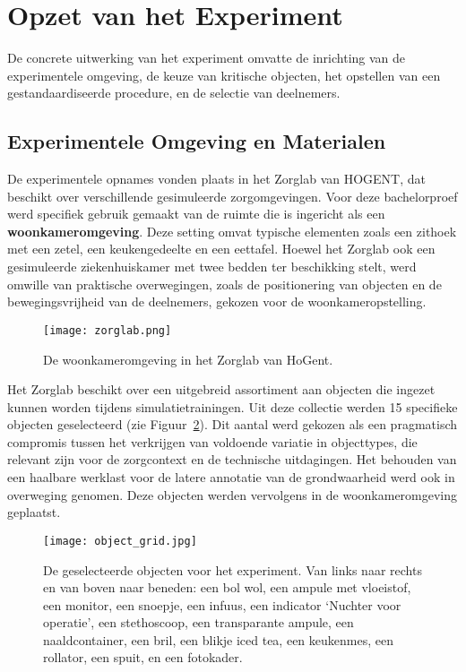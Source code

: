 \section{Opzet van het Experiment}

De concrete uitwerking van het experiment omvatte de inrichting van de experimentele omgeving, de keuze van kritische objecten, het opstellen van een gestandaardiseerde procedure, en de selectie van deelnemers.

\subsection{Experimentele Omgeving en Materialen}

De experimentele opnames vonden plaats in het Zorglab van HOGENT, dat beschikt over verschillende gesimuleerde zorgomgevingen. 
Voor deze bachelorproef werd specifiek gebruik gemaakt van de ruimte die is ingericht als een \textbf{woonkameromgeving}. 
Deze setting omvat typische elementen zoals een zithoek met een zetel, een keukengedeelte en een eettafel. 
Hoewel het Zorglab ook een gesimuleerde ziekenhuiskamer met twee bedden ter beschikking stelt, werd omwille van praktische overwegingen, 
zoals de positionering van objecten en de bewegingsvrijheid van de deelnemers, gekozen voor de woonkameropstelling.

\begin{figure}[H]
  \centering
  \texttt{[image: zorglab.png]}
  \caption[
De woonkameromgeving in het Zorglab van HoGent.
  ]{\label{fig:zorglab} De woonkameromgeving in het Zorglab van HoGent.}
\end{figure}

Het Zorglab beschikt over een uitgebreid assortiment aan objecten die ingezet kunnen worden tijdens simulatietrainingen. 
Uit deze collectie werden 15 specifieke objecten geselecteerd (zie Figuur~\ref{fig:object_grid}).
Dit aantal werd gekozen als een pragmatisch compromis tussen het verkrijgen van voldoende variatie in objecttypes, 
die relevant zijn voor de zorgcontext en de technische uitdagingen. Het behouden van een haalbare werklast voor de latere annotatie van de grondwaarheid werd ook in overweging genomen.
Deze objecten werden vervolgens in de woonkameromgeving geplaatst.

\begin{figure}[H]
  \centering
  \texttt{[image: object\_grid.jpg]}
  \caption[
    Geselecteerde objecten voor het experiment in het Zorglab
  ]{\label{fig:object_grid} De geselecteerde objecten voor het experiment. Van links naar rechts en van boven naar beneden: 
  een bol wol, een ampule met vloeistof, een monitor, een snoepje, een infuus, een indicator `Nuchter voor operatie', een stethoscoop, een transparante ampule, een naaldcontainer, een bril, een blikje iced tea, een keukenmes, een rollator, een spuit, en een fotokader. 
  }
\end{figure}

